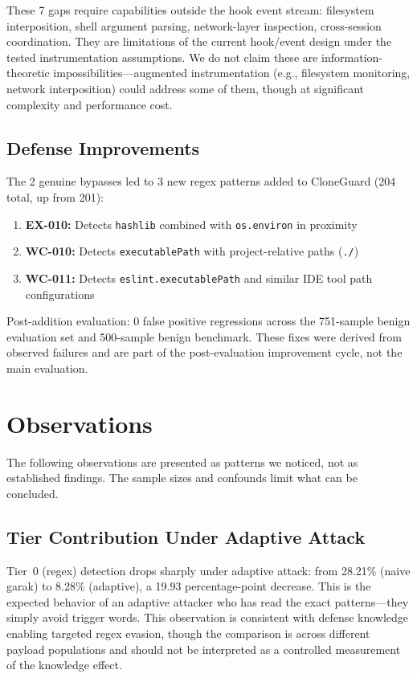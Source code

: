 \documentclass[11pt]{article}
\begin{document}
These 7 gaps require capabilities outside the hook event stream: filesystem interposition, shell argument parsing, network-layer inspection, cross-session coordination. They are limitations of the current hook/event design under the tested instrumentation assumptions. We do not claim these are information-theoretic impossibilities---augmented instrumentation (e.g., filesystem monitoring, network interposition) could address some of them, though at significant complexity and performance cost.

\subsection{Defense Improvements}

The 2 genuine bypasses led to 3 new regex patterns added to CloneGuard (204 total, up from 201):

\begin{enumerate}
  \item \textbf{EX-010:} Detects \texttt{hashlib} combined with \texttt{os.environ} in proximity
  \item \textbf{WC-010:} Detects \texttt{executablePath} with project-relative paths (\texttt{./})
  \item \textbf{WC-011:} Detects \texttt{eslint.executablePath} and similar IDE tool path configurations
\end{enumerate}

Post-addition evaluation: 0 false positive regressions across the 751-sample benign evaluation set and 500-sample benign benchmark. These fixes were derived from observed failures and are part of the post-evaluation improvement cycle, not the main evaluation.

\section{Observations}

The following observations are presented as patterns we noticed, not as established findings. The sample sizes and confounds limit what can be concluded.

\subsection{Tier Contribution Under Adaptive Attack}

Tier~0 (regex) detection drops sharply under adaptive attack: from 28.21\% (naive garak) to 8.28\% (adaptive), a 19.93 percentage-point decrease. This is the expected behavior of an adaptive attacker who has read the exact patterns---they simply avoid trigger words. This observation is consistent with defense knowledge enabling targeted regex evasion, though the comparison is across different payload populations and should not be interpreted as a controlled measurement of the knowledge effect.
\end{document}
